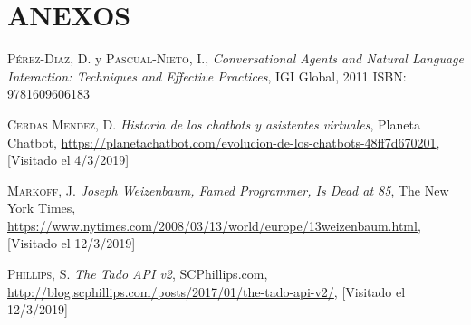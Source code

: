 \documentclass[spanish,12pt, a4paper, twoside]{paper}
\let\oldsection\section
\def\section{\cleardoublepage\oldsection}
\begin{document}
\section*{ANEXOS}


\newpage

\begin{thebibliography}{00}
 \textsc{Pérez-Diaz, D.} y \textsc{Pascual-Nieto, I.},
	\textit{Conversational Agents and Natural Language Interaction: Techniques and Effective Practices}, IGI Global, 2011 ISBN: 9781609606183
	
 \textsc{Cerdas Mendez, D.}
	\textit{Historia de los chatbots y asistentes virtuales}, Planeta Chatbot, \url{https://planetachatbot.com/evolucion-de-los-chatbots-48ff7d670201}, [Visitado el 4/3/2019]
	
 \textsc{Markoff, J.}
	\textit{Joseph Weizenbaum, Famed Programmer, Is Dead at 85}, The New York Times, \url{https://www.nytimes.com/2008/03/13/world/europe/13weizenbaum.html}, [Visitado el 12/3/2019]
	
 \textsc{Phillips, S.}
	\textit{The Tado API v2}, SCPhillips.com, \url{http://blog.scphillips.com/posts/2017/01/the-tado-api-v2/}, [Visitado el 12/3/2019]
\end{thebibliography}
\end{document}
